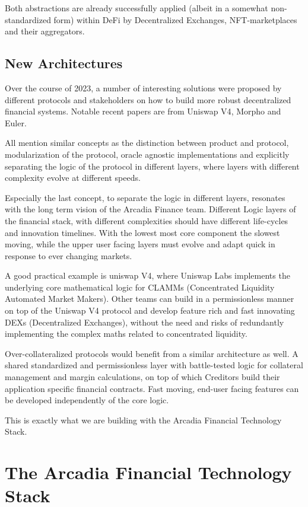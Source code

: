 \documentclass[sigconf,nonacm]{acmart}
\begin{document}
Both abstractions are already successfully applied (albeit in a somewhat non-standardized form) within DeFi by Decentralized Exchanges, NFT-marketplaces and their aggregators.

\subsection{New Architectures}
\label{subsec:new-architectures}
Over the course of 2023, a number of interesting solutions were proposed by different protocols and stakeholders on how to build more robust decentralized financial systems.
Notable recent papers are from Uniswap V4\cite{adams2023uniswap}, Morpho\cite{gontier2023morpho} and Euler\cite{euler2023protocols}.

All mention similar concepts as the distinction between product and protocol, modularization of the protocol,
oracle agnostic implementations and explicitly separating the logic of the protocol in different layers,
where layers with different complexity evolve at different speeds.

Especially the last concept, to separate the logic in different layers, resonates with the long term vision of the Arcadia Finance team.
Different Logic layers of the financial stack, with different complexities should have different life-cycles and innovation timelines.
With the lowest most core component the slowest moving, while the upper user facing layers must evolve and adapt quick in response to ever changing markets.

A good practical example is uniswap V4,
where Uniswap Labs implements the underlying core mathematical logic for CLAMMs (Concentrated Liquidity Automated Market Makers).
Other teams can build in a permissionless manner on top of the Uniswap V4 protocol and develop feature rich and fast innovating DEXs (Decentralized Exchanges),
without the need and risks of redundantly implementing the complex maths related to concentrated liquidity.

Over-collateralized protocols would benefit from a similar architecture as well.
A shared standardized and permissionless layer with battle-tested logic for collateral management and margin calculations,
on top of which Creditors build their application specific financial contracts.
Fast moving, end-user facing features can be developed independently of the core logic.

This is exactly what we are building with the Arcadia Financial Technology Stack.

\section{The Arcadia Financial Technology Stack}
\label{sec:arcadia-financial-technology-stack}
\end{document}
